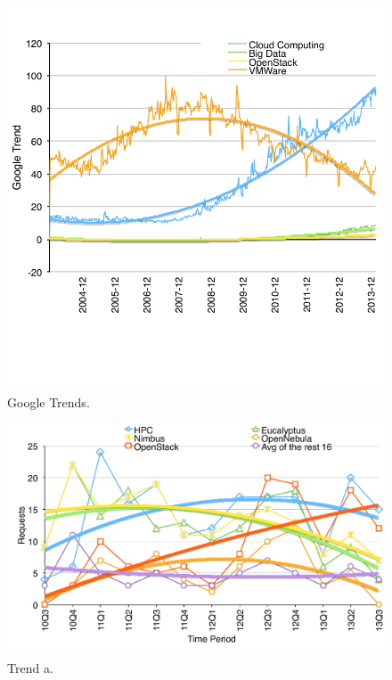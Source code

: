 \begin{figure}[htb]
  \centering
    \includegraphics[width=1.0\textwidth]{images/google-trend.pdf}
  \caption{Google Trends.}
\end{figure}

\begin{figure}[htb]
  \centering
    \includegraphics[width=1.0\textwidth]{images/trend-a.pdf}
  \caption{Trend a.}
\end{figure}

